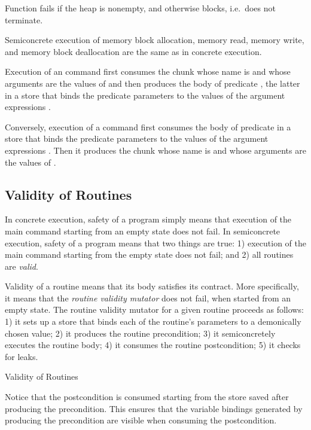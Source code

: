 \documentclass{CSML}
\theoremstyle{definition}\newtheorem{notation}[thm]{Notation}
\theoremstyle{plain}\newtheorem{satz}[thm]{Satz}
\begin{document}
Function  fails if the heap is nonempty, 
and otherwise blocks, i.e.~does not terminate. 

Semiconcrete execution of memory block allocation, memory read, 
memory write, and memory block deallocation are the same as in 
concrete execution.

Execution of an  command  first consumes the chunk whose name is  and 
whose arguments are the values of  and then 
produces the body of predicate , the latter in a store that 
binds the predicate parameters  to the values of 
the argument expressions . 

Conversely, execution of a  command 
 first consumes the body of 
predicate  in a store that binds the predicate parameters 
 to the values of the argument expressions 
. Then it produces the chunk whose name is  
and whose arguments are the values of . 

\subsection{Validity of Routines}

In concrete execution, safety of a program simply means that 
execution of the main command starting from an empty state does 
not fail. In semiconcrete execution, safety of a program means 
that two things are true: 1) execution of the main command 
starting from the empty state does not fail; and 2) all 
routines are \emph{valid}.

Validity of a routine means that its body satisfies its 
contract. More specifically, it means that the \emph{routine 
validity mutator} does not fail, when started from an empty 
state. The routine validity mutator for a given routine  
proceeds as follows: 1) it sets up a store that binds each of the routine's parameters to a demonically chosen value;
2) it produces the routine precondition; 
3) it semiconcretely executes the routine body; 4) it consumes 
the routine postcondition; 5) it checks for leaks.

\begin{defi}{Validity of Routines}



\end{defi}

Notice that the postcondition is consumed starting from the store saved after producing the precondition.
This ensures that the variable bindings generated by producing the precondition are
visible when consuming the postcondition.
\end{document}
